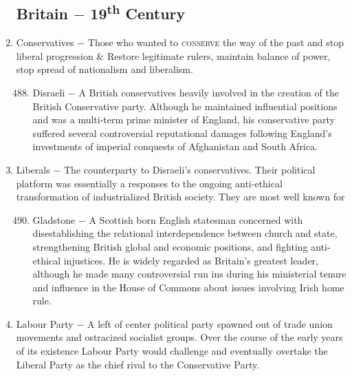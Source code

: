 \documentclass[12pt]{article}
\begin{document}
\begin{enumerate}
\subsection{Britain $-$ 19\textsuperscript{th} Century}

\item Conservatives $-$ Those who wanted to \textsc{conserve} the way of the past and stop liberal progression & Restore legitimate rulers, maintain balance of power, stop spread of nationalism and liberalism. 

\begin{enumerate}[label=\arabic{*}.]
\setcounter{enumii}{487}

\item Disraeli $-$ A British conservatives heavily involved in the creation of the British Conservative party. Although he maintained influential positions and was a multi-term prime minister of England, his conservative party suffered several controversial reputational damages following England's investments of imperial conquests of Afghanistan and South Africa.

\end{enumerate}
\setcounter{enumi}{488}

\item Liberals $-$ The counterparty to Disraeli's conservatives. Their political platform was essentially a responses to the ongoing anti-ethical transformation of industrialized British society. They are most well known for 

\begin{enumerate}[label=\arabic{*}.]
\setcounter{enumii}{489}

\item Gladstone $-$ A Scottish born English statesman concerned with disestablishing the relational interdependence between church and state, strengthening British global and economic positions, and fighting anti-ethical injustices. He is widely regarded as Britain's greatest leader, although he made many controversial run ins during his ministerial tenure and influence in the House of Commons about issues involving Irish home rule. 

\end{enumerate}
\setcounter{enumi}{490}

\item Labour Party $-$ A left of center political party spawned out of trade union movements and ostracized socialist groups. Over the course of the early years of its existence Labour Party would challenge and eventually overtake the Liberal Party as the chief rival to the Conservative Party.


\end{enumerate}
\end{document}
